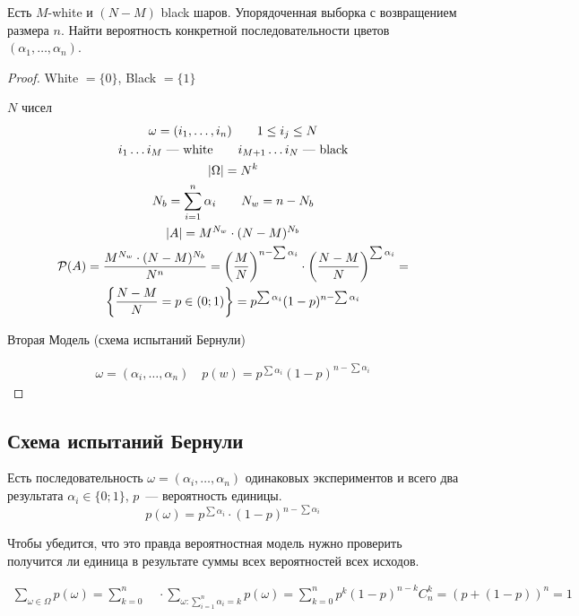 \begin{problem}
    Есть $M$-white и $(N-M)$ black шаров. Упорядоченная выборка с возвращением размера $n$. Найти вероятность конкретной последовательности цветов $(\alpha_1,\ldots, \alpha_n)$.   
\end{problem}
\begin{proof}
White $= \{0\}$, Black $= \{1\}$
    
$N$ чисел 
\begin{gather*}
\omega = (i_1,\ldots, i_n) \qquad 1 \leq i_j \leq N\\
i_1 \ldots i_M \text{ --- white} \qquad
i_{M+1} \ldots i_N \text{ --- black} \\
|\Omega| = N^k\\
N_b = \sum_{i=1}^n \alpha_i \qquad N_w = n-N_b \\
|A| = M^{N_w} \cdot (N-M)^{N_b} \\
\mathcal{P}(A) = \frac{M^{N_w} \cdot (N-M)^{N_b}}{N^n} = 
\left( \frac{M}{N} \right)^{n - \sum \alpha_i} \cdot \left( \frac{N-M}{N}\right)^{\sum\alpha_i} = \\
\left\{\frac{N-M}{N}=p\in(0;1)\right\} =
p^{\sum\alpha_i}(1-p)^{n-\sum\alpha_i}
\end{gather*}

Вторая Модель (схема испытаний Бернули) 

 \begin{gather*}
     \omega = (\alpha_i,\ldots,\alpha_n) \quad
     p(w) = p^{\sum\alpha_i}(1-p)^{n-\sum\alpha_i}
 \end{gather*}
\end{proof}

\subsection{Схема испытаний Бернули}
Есть последовательность $\omega = (\alpha_i,\ldots,\alpha_n)$ одинаковых экспериментов и всего два результата $\alpha_i \in \{0;1\}$, $p$~--- вероятность единицы.
\[ p(\omega) = p^{\sum\alpha_i}\cdot(1-p)^{n-\sum\alpha_i} \]

Чтобы убедится, что это правда вероятностная модель нужно проверить получится ли единица в результате суммы всех вероятностей всех исходов.

\begin{gather*}
    \sum_{\omega\in\Omega}p(\omega)=
    \sum_{k=0}^n \quad \cdot \sum_{\omega:\sum_{i=1}^n\alpha_i=k} p(\omega) =
    \sum_{k=0}^np^k (1 - p)^{n-k} C_n^k = (p + (1 - p))^n = 1
\end{gather*}


